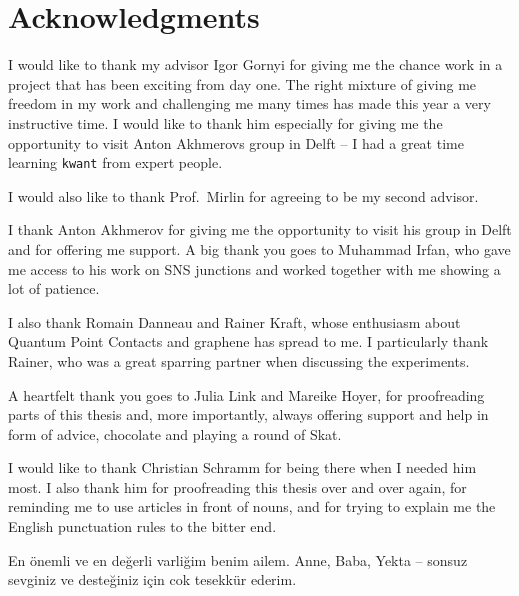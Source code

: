 \chapter*{Acknowledgments}

I would like to thank my advisor Igor Gornyi for giving me the chance work in a project that has been exciting from day one. The right mixture of giving me freedom in my work and challenging me many times has made this year a very instructive time. I would like to thank him especially for giving me the opportunity to visit Anton Akhmerovs group in Delft -- I had a great time learning \texttt{kwant} from expert people.

I would also like to thank Prof.~Mirlin for agreeing to be my second advisor. 

I thank Anton Akhmerov for giving me the opportunity to visit his group in Delft and for offering me support. A big thank you goes to Muhammad Irfan, who gave me access to his work on SNS junctions and worked together with me showing a lot of patience. 

I also thank Romain Danneau and Rainer Kraft, whose enthusiasm about Quantum Point Contacts and graphene has spread to me. I particularly thank Rainer, who was a great sparring partner when discussing the experiments.

A heartfelt thank you goes to Julia Link and Mareike Hoyer, for proofreading parts of this thesis and, more importantly, always offering support and help in form of advice, chocolate and playing a round of Skat. 

I would like to thank Christian Schramm for being there when I needed him most. I also thank him for proofreading this thesis over and over again, for reminding me to use articles in front of nouns, and for trying to explain me the English punctuation rules to the bitter end.

En \"onemli ve en de\u{g}erli varli\u{g}im benim ailem. Anne, Baba, Yekta -- sonsuz sevginiz ve deste\u{g}iniz i\c{c}in cok tesekk\"ur ederim. 


 

